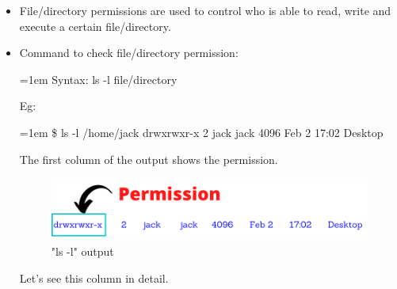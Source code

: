 \setlength{\columnsep}{3pt}
\begin{flushleft}
	
	\begin{itemize}
		\item File/directory permissions are used to control who is able to read, write and execute
		a certain file/directory.
		\item Command to check file/directory permission:
		\bigskip
		\begin{tcolorbox}[breakable,notitle,boxrule=0pt,colback=pink,colframe=pink]
			\color{black}
			\font=1em
			Syntax: ls -l file/directory
			\font=4pt
		\end{tcolorbox}
		Eg:
		\bigskip
		\begin{tcolorbox}[breakable,notitle,boxrule=1pt,colback=black,colframe=black]
			\color{green}
			\font=1em
			\$ ls -l /home/jack
			\color{white}
			\newline
			drwxrwxr-x 2 jack jack 4096 Feb  2 17:02 Desktop
			\font=4pt
		\end{tcolorbox}
		\bigskip		
		\bigskip
			The first column of the output shows the permission.
		\begin{figure}[h!]
			\centering
			\includegraphics[scale=0.5]{content/chapter5/images/permission.png}
			\caption{"ls -l" output}
			\label{fig:Sample permission}
		\end{figure}
		
		Let's see this column in detail.
	\end{itemize}

	
	
	
\end{flushleft}

\newpage

